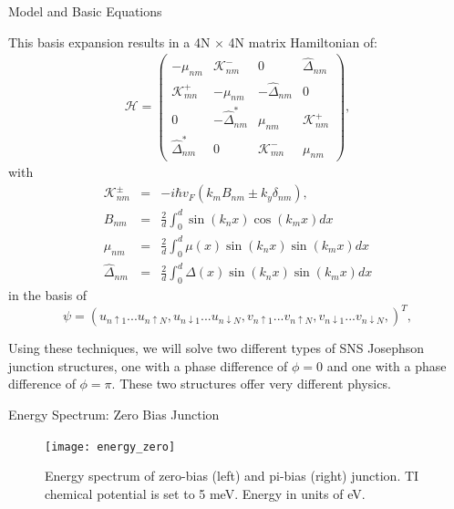 \documentclass[]{beamer}
\begin{document}
 \begin{frame}{Model and Basic Equations}


This basis expansion results in a 4N $\times$ 4N matrix Hamiltonian of:
\begin{eqnarray}
&\mathcal{H}=\left(
\begin{array}{cccc}
-\mu_{nm} &  \mathcal{K}^-_{nm} & 0 & \hat{\Delta}_{nm} \\
\mathcal{K}^+_{mn}  & -\mu_{nm}  & -\hat{\Delta}_{nm} & 0 \\
0 & -\hat{\Delta}_{nm}^\ast  & \mu_{nm} &  \mathcal{K}^+_{nm}\\
\hat{\Delta}_{nm}^\ast & 0 &  \mathcal{K}^-_{mn}  & \mu_{nm}
\end{array}\label{fkmodel}
\right),&
\end{eqnarray}
with
\begin{eqnarray}
\mathcal{K}^{\pm}_{nm}&=& -i\hbar  v_F (k_m B_{nm} \pm  k_y \delta_{nm}),\\
B_{nm} &=& \frac{2}{d}\int^d_0  \sin(k_n x) \cos(k_m x) dx\\
\mu_{nm}&=& \frac{2}{d}\int^d_0 \mu(x) \sin(k_n x) \sin(k_m x) dx\\
\hat{\Delta}_{nm}&=&  \frac{2}{d}\int^d_0 \Delta(x) \sin(k_n x) \sin(k_m x) dx
\end{eqnarray}
in the basis of
\begin{equation*}
\psi=  \left ( u_{n\uparrow1}...u_{n\uparrow N}, u_{n\downarrow1}...u_{n\downarrow N}, v_{n\uparrow1}...v_{n\uparrow N}, v_{n\downarrow1}...v_{n\downarrow N}, \right )^T,
\end{equation*} 

Using these techniques, we will solve two different types of SNS Josephson junction structures, one with a phase difference of $\phi=0$ and one with a phase difference of $\phi=\pi$. These two structures offer very different physics.


\clearpage

\end{frame}  


\begin{frame}{Energy Spectrum: Zero Bias Junction}

\begin{figure}[h]
\texttt{[image: energy\_zero]}
\caption{Energy spectrum of zero-bias (left) and pi-bias (right) junction. TI chemical potential is set to 5 meV. Energy in units of eV.
}\label{jj-energy}
\end{figure}
\end{frame}  
\end{document}
